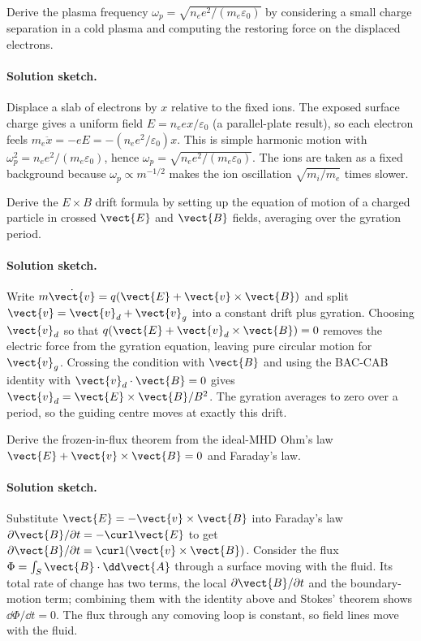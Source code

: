 \begin{exercise}
Derive the plasma frequency $\omega_{p} = \sqrt{n_{e}e^{2}/
(m_{e}\varepsilon_{0})}$ by considering a small charge separation in
a cold plasma and computing the restoring force on the displaced
electrons.
\paragraph{Solution sketch.} Displace a slab of electrons by $x$ relative
to the fixed ions. The exposed surface charge gives a uniform field $E =
n_{e}ex/\varepsilon_{0}$ (a parallel-plate result), so each electron feels
$m_{e}\ddot{x} = -eE = -(n_{e}e^{2}/\varepsilon_{0})x$. This is simple
harmonic motion with $\omega_{p}^{2} = n_{e}e^{2}/(m_{e}\varepsilon_{0})$,
hence $\omega_{p} = \sqrt{n_{e}e^{2}/(m_{e}\varepsilon_{0})}$. The ions
are taken as a fixed background because $\omega_{p}\propto m^{-1/2}$ makes
the ion oscillation $\sqrt{m_{i}/m_{e}}$ times slower.
\end{exercise}

\begin{exercise}
Derive the $E\times B$ drift formula by setting up the equation of
motion of a charged particle in crossed $\vect{E}$ and $\vect{B}$
fields, averaging over the gyration period.
\paragraph{Solution sketch.} Write $m\dot{\vect{v}} = q(\vect{E} +
\vect{v}\times\vect{B})$ and split $\vect{v} = \vect{v}_{d} +
\vect{v}_{g}$ into a constant drift plus gyration. Choosing $\vect{v}_{d}$
so that $q(\vect{E} + \vect{v}_{d}\times\vect{B}) = 0$ removes the electric
force from the gyration equation, leaving pure circular motion for
$\vect{v}_{g}$. Crossing the condition with $\vect{B}$ and using the BAC-CAB
identity with $\vect{v}_{d}\cdot\vect{B} = 0$ gives $\vect{v}_{d} =
\vect{E}\times\vect{B}/B^{2}$. The gyration averages to zero over a period,
so the guiding centre moves at exactly this drift.
\end{exercise}

\begin{exercise}
Derive the frozen-in-flux theorem from the ideal-MHD Ohm's law
$\vect{E} + \vect{v}\times \vect{B} = 0$ and Faraday's law.
\paragraph{Solution sketch.} Substitute $\vect{E} = -\vect{v}\times
\vect{B}$ into Faraday's law $\partial\vect{B}/\partial t = -\curl\vect{E}$
to get $\partial\vect{B}/\partial t = \curl(\vect{v}\times\vect{B})$.
Consider the flux $\Phi = \int_{S}\vect{B}\cdot\dd\vect{A}$ through a
surface moving with the fluid. Its total rate of change has two terms, the
local $\partial\vect{B}/\partial t$ and the boundary-motion term; combining
them with the identity above and Stokes' theorem shows $\dd\Phi/\dd t = 0$.
The flux through any comoving loop is constant, so field lines move with
the fluid.
\end{exercise}

